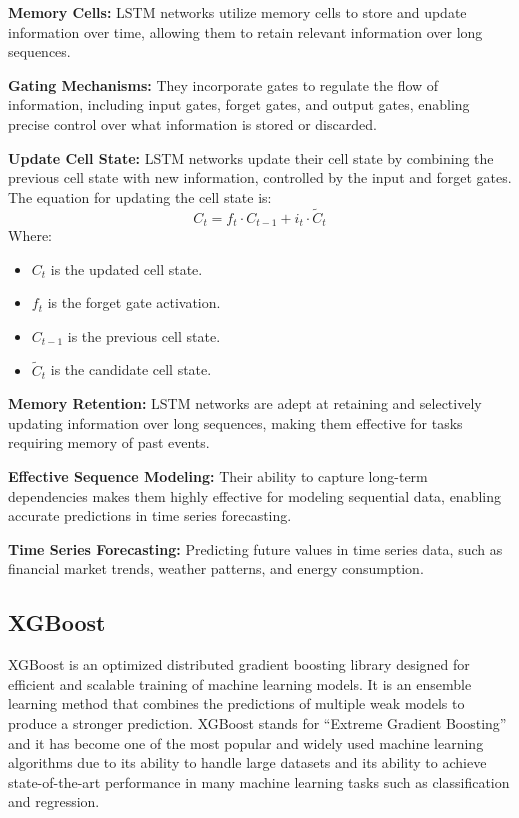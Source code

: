 \documentclass{ieeeojies}
\begin{document}
\textbf{Memory Cells:} LSTM networks utilize memory cells to store and update information over time, allowing them to retain relevant information over long sequences.
  
\textbf{Gating Mechanisms:} They incorporate gates to regulate the flow of information, including input gates, forget gates, and output gates, enabling precise control over what information is stored or discarded.

\textbf{Update Cell State:} LSTM networks update their cell state by combining the previous cell state with new information, controlled by the input and forget gates. The equation for updating the cell state is:
\begin{equation*}
  C_t = f_t \cdot C_{t-1} + i_t \cdot \tilde{C}_t
\end{equation*}
Where:
        \begin{itemize}
            \item \( C_t \) is the updated cell state.
            \item \( f_t \) is the forget gate activation.
            \item \( C_{t-1} \) is the previous cell state.
            \item \( \tilde{C}_t \) is the candidate cell state.
        \end{itemize}

\textbf{Memory Retention:} LSTM networks are adept at retaining and selectively updating information over long sequences, making them effective for tasks requiring memory of past events.
  
\textbf{Effective Sequence Modeling:} Their ability to capture long-term dependencies makes them highly effective for modeling sequential data, enabling accurate predictions in time series forecasting.

\textbf{Time Series Forecasting:} Predicting future values in time series data, such as financial market trends, weather patterns, and energy consumption.


\subsection{XGBoost} 

XGBoost is an optimized distributed gradient boosting library designed for efficient and scalable training of machine learning models. It is an ensemble learning method that combines the predictions of multiple weak models to produce a stronger prediction. XGBoost stands for “Extreme Gradient Boosting” and it has become one of the most popular and widely used machine learning algorithms due to its ability to handle large datasets and its ability to achieve state-of-the-art performance in many machine learning tasks such as classification and regression.\\
\end{document}
